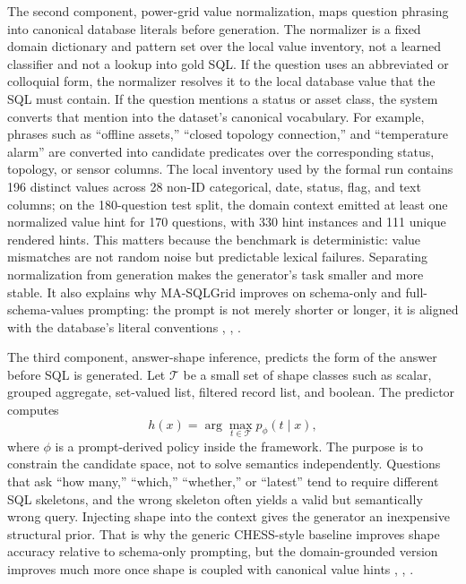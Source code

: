 \documentclass{ieeeaccess}
\begin{document}
The second component, power-grid value normalization, maps question phrasing into canonical database literals before generation. The normalizer is a fixed domain dictionary and pattern set over the local value inventory, not a learned classifier and not a lookup into gold SQL. If the question uses an abbreviated or colloquial form, the normalizer resolves it to the local database value that the SQL must contain. If the question mentions a status or asset class, the system converts that mention into the dataset's canonical vocabulary. For example, phrases such as ``offline assets,'' ``closed topology connection,'' and ``temperature alarm'' are converted into candidate predicates over the corresponding status, topology, or sensor columns. The local inventory used by the formal run contains 196 distinct values across 28 non-ID categorical, date, status, flag, and text columns; on the 180-question test split, the domain context emitted at least one normalized value hint for 170 questions, with 330 hint instances and 111 unique rendered hints. This matters because the benchmark is deterministic: value mismatches are not random noise but predictable lexical failures. Separating normalization from generation makes the generator's task smaller and more stable. It also explains why MA-SQLGrid improves on schema-only and full-schema-values prompting: the prompt is not merely shorter or longer, it is aligned with the database's literal conventions \cite{brunner2020valuenet}, \cite{chen2023large}, \cite{liu2022semantic}.

The third component, answer-shape inference, predicts the form of the answer before SQL is generated. Let \(\mathcal{T}\) be a small set of shape classes such as scalar, grouped aggregate, set-valued list, filtered record list, and boolean. The predictor computes \[
h(x) = \arg\max_{t \in \mathcal{T}} p_\phi(t \mid x),
\] where \(\phi\) is a prompt-derived policy inside the framework. The purpose is to constrain the candidate space, not to solve semantics independently. Questions that ask ``how many,'' ``which,'' ``whether,'' or ``latest'' tend to require different SQL skeletons, and the wrong skeleton often yields a valid but semantically wrong query. Injecting shape into the context gives the generator an inexpensive structural prior. That is why the generic CHESS-style baseline improves shape accuracy relative to schema-only prompting, but the domain-grounded version improves much more once shape is coupled with canonical value hints \cite{liu2023divide}, \cite{talaei2024chess}, \cite{wang2023macsql}.
\end{document}
